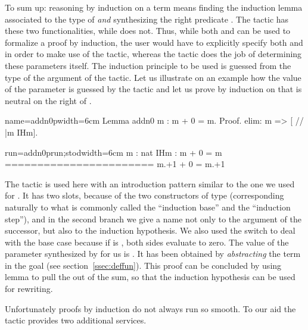 To sum up: reasoning by induction on a term  means
finding the induction lemma associated to the type of 
\emph{and} synthesizing
the right predicate .  The  tactic has these two
functionalities, while  does not. Thus, while both 
and  can be used to formalize a proof by induction, the
user would have to explicitly specify both  and  in order to
make use of the  tactic, whereas the  tactic
does the job of determining these parameters itself.
The induction principle
to be used is guessed from the type of the argument of the tactic. Let
us illustrate on an example how the value of the parameter  is
guessed by the  tactic and let us prove by induction on 
that  is neutral on the right of .

\begin{coq-left}{name=addn0p}{width=6cm}
Lemma addn0 m : m + 0 = m.
Proof.
elim: m => [ // |m IHm].
\end{coq-left}
\begin{coqout-right}{run=addn0prun;stod}{width=6cm}
m : nat
IHm : m + 0 = m
=======================
m.+1 + 0 = m.+1
\end{coqout-right}

The  tactic is used here with an introduction pattern similar
to the one we used for . It has two slots, because of the
two constructors of type  (corresponding naturally to what is
commonly called the ``induction base'' and the ``induction step''),
and in the second branch we give a
name not only to the argument  of the successor, but also to the
induction hypothesis. We also used the \C{//} switch to deal with the
base case because if
 is , both sides evaluate to zero. The value of the parameter
 synthesized by  for us is
. It has been obtained by
\emph{abstracting} the term  in the goal (see
section~\ref{ssec:deffun}). This proof can be concluded by using
lemma 
to  pull the  out of the sum, so that the induction hypothesis
 can be used for rewriting.

Unfortunately proofs by induction do not always run so smooth.
To our aid the  tactic provides two additional services.

